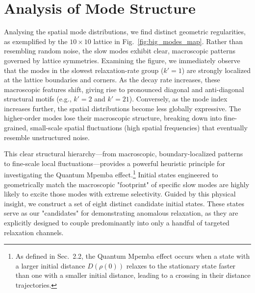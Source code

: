 \documentclass[pdflatex,sn-mathphys-num]{sn-jnl}
\begin{document}
\section{Analysis of Mode Structure}


Analysing the spatial mode distributions, we find distinct geometric regularities, as exemplified by the $10 \times 10$ lattice in Fig.~\ref{fig:big_modes_map}. Rather than resembling random noise, the slow modes exhibit clear, macroscopic patterns governed by lattice symmetries. Examining the figure, we immediately observe that the modes in the slowest relaxation-rate group ($k'=1$) are strongly localized at the lattice boundaries and corners. As the decay rate increases, these macroscopic features shift, giving rise to pronounced diagonal and anti-diagonal structural motifs (e.g., $k'=2$ and $k'=21$). Conversely, as the mode index increases further, the spatial distributions become less globally expressive. The higher-order modes lose their macroscopic structure, breaking down into fine-grained, small-scale spatial fluctuations (high spatial frequencies) that eventually resemble unstructured noise.

This clear structural hierarchy---from macroscopic, boundary-localized patterns to fine-scale local fluctuations---provides a powerful heuristic principle for investigating the Quantum Mpemba effect.\footnote{As defined in Sec.~2.2, the Quantum Mpemba effect occurs when a state with a larger initial distance $D(\rho(0))$ relaxes to the stationary state faster than one with a smaller initial distance, leading to a crossing in their distance trajectories.} Initial states engineered to geometrically match the macroscopic "footprint" of specific slow modes are highly likely to excite those modes with extreme selectivity. Guided by this physical insight, we construct a set of eight distinct candidate initial states. These states serve as our "candidates" for demonstrating anomalous relaxation, as they are explicitly designed to couple predominantly into only a handful of targeted relaxation channels.
\end{document}
